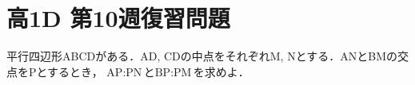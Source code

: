 \documentclass[dvipdfmx,uplatex,b5paper]{jsarticle}
\begin{document}
\section*{高1D 第10週復習問題}
平行四辺形ABCDがある．AD, CDの中点をそれぞれM, Nとする．ANとBMの交点をPとするとき，
$\text{AP}:\text{PN}$と$\text{BP}:\text{PM}$を求めよ．
\end{document}
